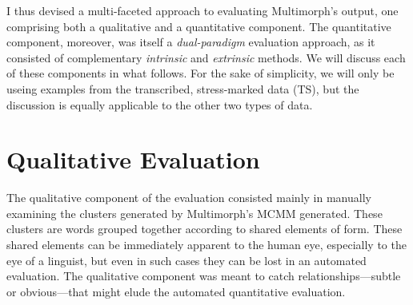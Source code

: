 
I thus devised a multi-faceted approach to evaluating Multimorph's output, one comprising both
a qualitative and a quantitative component. The quantitative component, moreover, 
was itself a \emph{dual-paradigm}
evaluation approach, as it consisted of complementary \emph{intrinsic} and \emph{extrinsic} methods. 
 We will discuss each of these components in what follows. For the sake of simplicity,
we will only be useing examples from the transcribed, stress-marked data (TS),
 but the discussion is equally applicable to
the other two types of data.


\section{Qualitative Evaluation} \label{sec:qualitative}
The qualitative component of the evaluation consisted mainly in manually examining the clusters generated by Multimorph's MCMM generated. These clusters are words grouped together according to shared elements of form. These shared elements can be immediately apparent to the human eye, especially to the eye of a linguist, but even in such cases they can be lost in an automated evaluation. %
The qualitative component was meant to catch relationships---subtle or obvious---that might elude the automated 
quantitative evaluation. 

